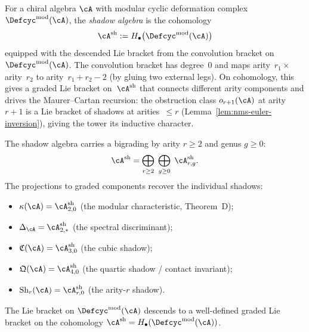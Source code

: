\begin{definition}
\label{def:shadow-algebra}
\ClaimStatusProvedHere
{}
For a chiral algebra $\cA$ with modular cyclic deformation complex
$\Defcyc^{\mathrm{mod}}(\cA)$, the \emph{shadow algebra} is the
cohomology
\begin{equation}
\label{eq:shadow-algebra}
\cA^{\mathrm{sh}}
:=
H_\bullet\bigl(\Defcyc^{\mathrm{mod}}(\cA)\bigr)
\end{equation}
equipped with the descended Lie bracket from the convolution
bracket on~$\Defcyc^{\mathrm{mod}}(\cA)$.
The convolution bracket has degree~$0$ and maps
arity~$r_1 \times$ arity~$r_2$ to arity~$r_1 + r_2 - 2$
\textup{(}by gluing two external legs\textup{)}.  On cohomology,
this gives a graded Lie bracket on~$\cA^{\mathrm{sh}}$ that
connects different arity components and drives the
Maurer--Cartan recursion: the obstruction class
$o_{r+1}(\cA)$ at arity~$r+1$ is a Lie bracket of
shadows at arities~$\leq r$
\textup{(}Lemma~\textup{\ref{lem:nms-euler-inversion})},
giving the tower its inductive character.
\par
The shadow algebra carries a bigrading by arity
$r \geq 2$ and genus $g \geq 0$:
\begin{equation}
\label{eq:shadow-algebra-bigrading}
\cA^{\mathrm{sh}}
=
\bigoplus_{r \geq 2}\;\bigoplus_{g \geq 0}\;
\cA^{\mathrm{sh}}_{r,g}.
\end{equation}
The projections to graded components recover the individual shadows:
\begin{itemize}
\item $\kappa(\cA) = \cA^{\mathrm{sh}}_{2,0}$
  \quad(the modular characteristic, Theorem~D);
\item $\Delta_{\cA} = \cA^{\mathrm{sh}}_{2,*}$
  \quad(the spectral discriminant);
\item $\mathfrak{C}(\cA) = \cA^{\mathrm{sh}}_{3,0}$
  \quad(the cubic shadow);
\item $\mathfrak{Q}(\cA) = \cA^{\mathrm{sh}}_{4,0}$
  \quad(the quartic shadow / contact invariant);
\item $\operatorname{Sh}_r(\cA) = \cA^{\mathrm{sh}}_{r,0}$
  \quad(the arity-$r$ shadow).
\end{itemize}
\end{definition}

\begin{lemma}
\label{lem:shadow-bracket-well-defined}
The Lie bracket on $\Defcyc^{\mathrm{mod}}(\cA)$ descends to a
well-defined graded Lie bracket on the cohomology
$\cA^{\mathrm{sh}} = H_\bullet(\Defcyc^{\mathrm{mod}}(\cA))$.
\end{lemma}

